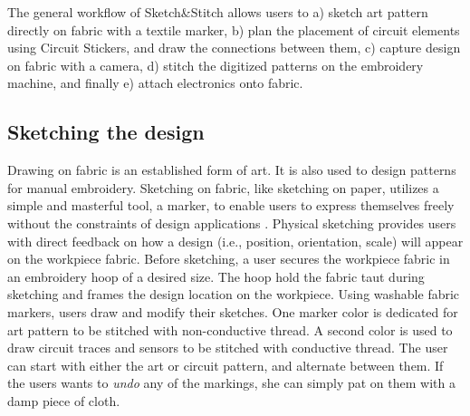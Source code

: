\documentclass[header.tex]{subfiles}
\begin{document}
The general workflow of Sketch\&Stitch allows users to a) sketch art pattern directly on fabric with a textile marker, b) plan the placement of circuit elements using Circuit Stickers, and draw the connections between them, c) capture design on fabric with a camera, d) stitch the digitized patterns on the embroidery machine, and finally e) attach electronics onto fabric.





\subsection{Sketching the design}
Drawing on fabric is an established form of art. It is also used to design patterns for manual embroidery. 
Sketching on fabric, like sketching on paper, utilizes a simple and masterful tool, a marker, to enable users to express themselves freely without the constraints of design applications \cite{schweikardt2000digital}. Physical sketching provides users with direct feedback on how a design (i.e., position, orientation, scale) will appear on the workpiece fabric. 
Before sketching, a user secures the workpiece fabric in an embroidery hoop of a desired size. The hoop hold the fabric taut during sketching and frames the design location on the workpiece. 
Using washable fabric markers, users draw and modify their sketches. One marker color is dedicated for art pattern to be stitched with non-conductive thread. A second color is used to draw circuit traces and sensors to be stitched with conductive thread. %
The user can start with either the art or circuit pattern, and alternate between them. If the users wants to \textit{undo} any of the markings, she can simply pat on them with a damp piece of cloth. 
 
\end{document}
